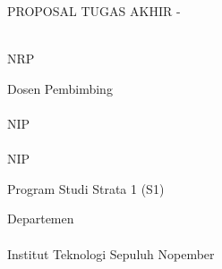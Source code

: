 \begin{large}
  PROPOSAL TUGAS AKHIR - \coursecode{}
\end{large}

\vspace{\fill}

\begin{spacing}{1.5}
  \begin{Large}
    \tatitle{}
  \end{Large}
\end{spacing}

\vspace{\fill}

\begin{large}
  \name{} \\
  \textmd{NRP \nrp{}}
\end{large}

\vspace{\fill}

\begin{large}
  \textmd{Dosen Pembimbing} \\
  \advisor{} \\
  \textmd{NIP \advisornip{}} \\
  \coadvisor{} \\
  \textmd{NIP \coadvisornip{}}
\end{large}

\vspace{\fill}

Program Studi Strata 1 (S1) \studyprogram{} \\

\mdseries

Departemen \studyprogram{} \\
\faculty{} \\
Institut Teknologi Sepuluh Nopember

\place{} \\
\the\year{}
